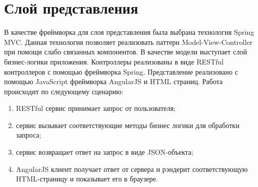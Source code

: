\section{Слой представления}

В качестве фреймворка для слоя представления была выбрана технология Spring MVC. Данная технология позволяет реализовать паттерн Model-View-Controller при помощи слабо связанных компонентов. В качестве модели выступает слой бизнес-логики приложения. Контроллеры реализованы в виде RESTful контроллеров с помощью фреймворка Spring. Представление реализовано с помощью JavaScript фреймворка AngularJS и HTML страниц. Работа происходит по следующему сценарию:
\begin{enumerate}
\item RESTful сервис принимает запрос от пользователя;
\item сервис вызывает соответствующие методы бизнес логики для обработки запроса;
\item сервис возвращает ответ на запрос в виде JSON-объекта;
\item AngularJS клиент получает ответ от сервера и рэндерит соответствующую HTML-страницу и показывает его в браузере.
\end{enumerate}

